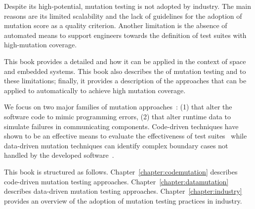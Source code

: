 Despite its high-potential, mutation testing is not adopted by industry. The main reasons are its limited scalability and the lack of guidelines for the adoption of mutation score as a quality criterion. Another limitation is the absence of automated means to support engineers towards the definition of test suites with high-mutation coverage.

This book provides a detailed  and how it can be applied in the context of space and embedded systems. 
This book also describes the  of mutation testing and  to these limitations; finally, it provides a description of the approaches that can be applied to automatically  to achieve high mutation coverage.

We focus on two major families of mutation approaches~\cite{natella2016assessing}: (1)  that alter the software code to mimic programming errors, (2)  that alter runtime data to simulate failures in communicating components. Code-driven techniques have shown to be an effective means to evaluate the effectiveness of test suites~\cite{Andrews06} while data-driven mutation techniques can identify complex boundary cases not handled by the developed software~\cite{di2015evolutionary}.

This book is structured as follows. 
Chapter~\ref{chapter:codemutation} describes code-driven mutation testing approaches. 
Chapter~\ref{chapter:datamutation} describes data-driven mutation testing approaches.
Chapter~\ref{chapter:industry} provides an overview of the adoption of mutation testing practices in industry.